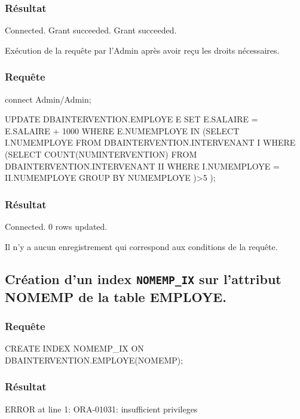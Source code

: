 \documentclass[•]{article}
\begin{document}
\subsubsection{Résultat}
\begin{sql}
Connected.
Grant succeeded.
Grant succeeded.
\end{sql}
\textrm{Exécution de la requête par l'Admin après avoir reçu les droits nécessaires.}

\subsubsection{Requête}
\begin{sql}
connect Admin/Admin;
	
UPDATE DBAINTERVENTION.EMPLOYE E 
SET E.SALAIRE = E.SALAIRE + 1000 
WHERE E.NUMEMPLOYE IN 
	(SELECT I.NUMEMPLOYE 
	FROM DBAINTERVENTION.INTERVENANT I 
	WHERE (SELECT COUNT(NUMINTERVENTION) 
		   FROM DBAINTERVENTION.INTERVENANT II
		   WHERE I.NUMEMPLOYE = II.NUMEMPLOYE
		   GROUP BY NUMEMPLOYE 
		   )>5
	);
\end{sql}

\subsubsection{Résultat}
\begin{sql}
Connected.
0 rows updated.
\end{sql}

\textrm{Il n'y a aucun enregistrement qui correspond aux conditions de la requête.}
\\

\subsection{Création d'un index \texttt{NOMEMP\_IX} sur l’attribut NOMEMP de la table EMPLOYE.}
\subsubsection{Requête}
\begin{sql}
CREATE INDEX NOMEMP_IX ON DBAINTERVENTION.EMPLOYE(NOMEMP);
\end{sql}

\subsubsection{Résultat}
\begin{sql}
ERROR at line 1:
ORA-01031: insufficient privileges
\end{sql}
\end{document}
